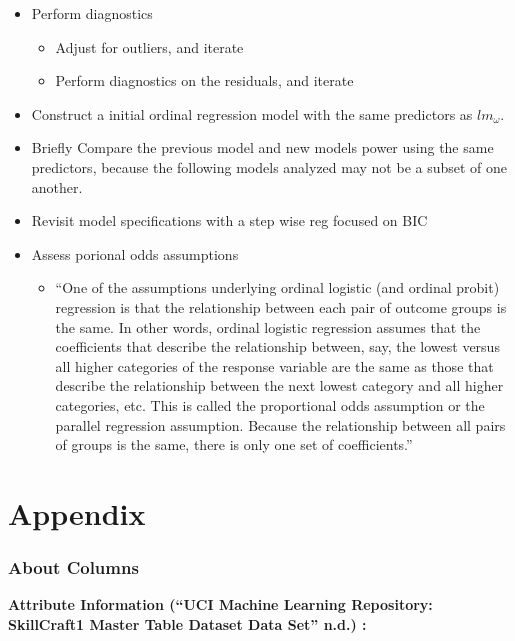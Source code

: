 \documentclass[]{article}
\providecommand{\tightlist}{%
  \setlength{\itemsep}{0pt}\setlength{\parskip}{0pt}}
\begin{document}
\begin{itemize}
\tightlist
\item
  Perform diagnostics

  \begin{itemize}
  \tightlist
  \item
    Adjust for outliers, and iterate
  \item
    Perform diagnostics on the residuals, and iterate
  \end{itemize}
\item
  Construct a initial ordinal regression model with the same predictors
  as \(lm_\omega\).
\item
  Briefly Compare the previous model and new models power using the same
  predictors, because the following models analyzed may not be a subset
  of one another.
\item
  Revisit model specifications with a step wise reg focused on BIC
\item
  Assess porional odds assumptions

  \begin{itemize}
  \tightlist
  \item
    ``One of the assumptions underlying ordinal logistic (and ordinal
    probit) regression is that the relationship between each pair of
    outcome groups is the same. In other words, ordinal logistic
    regression assumes that the coefficients that describe the
    relationship between, say, the lowest versus all higher categories
    of the response variable are the same as those that describe the
    relationship between the next lowest category and all higher
    categories, etc. This is called the proportional odds assumption or
    the parallel regression assumption. Because the relationship between
    all pairs of groups is the same, there is only one set of
    coefficients.''
  \end{itemize}
\end{itemize}

\hypertarget{appendix}{%
\section{Appendix}\label{appendix}}

\hypertarget{about-columns}{%
\subsubsection{About Columns}\label{about-columns}}

\textbf{Attribute Information (``UCI Machine Learning Repository:
SkillCraft1 Master Table Dataset Data Set'' n.d.) :}
\end{document}
